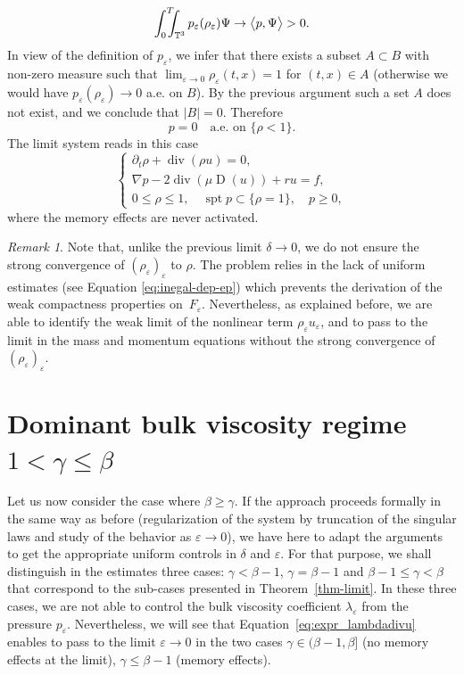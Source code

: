 \documentclass[10pt]{amsart}
\newcommand{\<}{\bigl\langle}
\renewcommand{\>}{\bigr\rangle}
\DeclareMathOperator{\spt}{spt}
\newcommand{\intTTT}{\int_0^T\hspace*{-2.5mm}\int_{\TT}}
\newcommand{\labeleq}[1]{}
\newenvironment{subnumcasess}{\begin{equation*}\begin{cases}}{\end{cases}\end{equation*}}
\theoremstyle{definition}
\theoremstyle{remark}
\newtheorem{remark}{Remark}
\newcommand{\TT}{\mathbb{T}^3}
\DeclareMathOperator{\Div}{div}
\DeclareMathOperator{\D}{D}
\let\ep\varepsilon
\begin{document}
\[
\intTTT{p_\ep(\rho_\ep) \Psi} \to \<p,\Psi\> > 0.
\]
In view of the definition of $p_\ep$, we infer that there exists a subset $A \subset B$ with non-zero measure such that $\lim_{\ep \rightarrow 0} \rho_\ep(t,x) = 1$ for $(t,x) \in A$ (otherwise we would have $p_\ep(\rho_\ep) \rightarrow 0$ a.e. on $B$).
By the previous argument such a set $A$ does not exist, and we conclude that $|B|=0$.
Therefore
\begin{equation}\label{eq:spt-p}
p = 0 \quad \text{a.e. on } \{\rho < 1 \}.
\end{equation}
The limit system reads in this case
\begin{subnumcasess}{\labeleq{pb_limit}}
\partial_t \rho + \Div(\rho u) = 0, \\
\nabla p -2\Div(\mu \D(u)) + ru = f, \\
0 \leq \rho \leq 1, \quad \spt p \subset \{ \rho = 1\}, \quad p \geq 0,
\end{subnumcasess}%
where the memory effects are never activated.
\begin{remark}{\label{rmk:cvg-rhoep}}
Note that, unlike the previous limit $\delta\rightarrow 0$, we do not ensure the strong convergence of $(\rho_\ep)_\ep$ to $\rho$.
The problem relies in the lack of uniform estimates (see Equation \eqref{eq:inegal-dep-ep}) which prevents the derivation of the weak compactness properties on~$F_\ep$.
Nevertheless, as explained before, we are able to identify the weak limit of the nonlinear term $\rho_\ep u_\ep$, and to pass to the limit in the mass and momentum equations without the strong convergence of $(\rho_\ep)_\ep$.
\end{remark}

\section{Dominant bulk viscosity regime \texorpdfstring{$1<\gamma\leq \beta$}{1gb}}{\label{sec:bulk}}

Let us now consider the case where $\beta \geq \gamma$.
If the approach proceeds formally in the same way as before (regularization of the system by truncation of the singular laws and study of the behavior as $\ep \rightarrow 0$), we have here to adapt the arguments to get the appropriate uniform controls in $\delta$ and $\ep$.
For that purpose, we shall distinguish in the estimates three cases: $\gamma < \beta-1$, $\gamma = \beta -1$ and $\beta-1 \leq \gamma < \beta$ that correspond to the sub-cases presented in Theorem~\ref{thm-limit}.
In these three cases, we are not able to control the bulk viscosity coefficient $\lambda_\ep$ from the pressure $p_\ep$.
Nevertheless, we will see that Equation~\eqref{eq:expr_lambdadivu} enables to pass to the limit $\ep \rightarrow 0$ in the two cases $\gamma \in (\beta-1, \beta]$ (no memory effects at the limit), $\gamma \leq \beta-1$ (memory effects).
\end{document}
